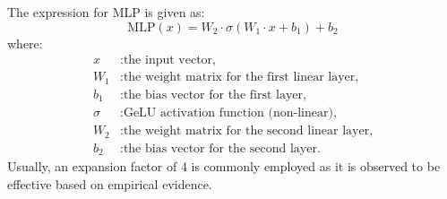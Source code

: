 The expression for MLP is given as:\\

\[\text{MLP}(x) = W_2 \cdot \sigma(W_1 \cdot x + b_1) + b_2\]
where:
\begin{align*}
    x      & : \text{the input vector,}                                \\
    W_1    & : \text{the weight matrix for the first linear layer,}  \\
    b_1    & : \text{the bias vector for the first layer,}             \\
    \sigma & : \text{GeLU activation function (non-linear),}           \\
    W_2    & : \text{the weight matrix for the second linear layer,} \\
    b_2    & : \text{the bias vector for the second layer.}
\end{align*}
Usually, an expansion factor of 4 is commonly employed as it is observed to be effective based on empirical evidence.\\
\\


